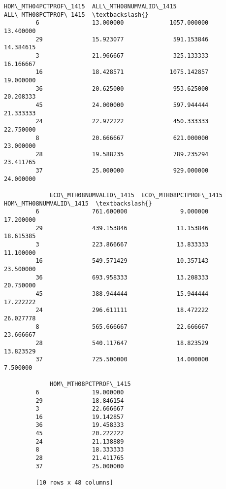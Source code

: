 \documentclass[11pt]{article}
\begin{document}
\begin{Verbatim}[commandchars=\\\{\}]
             HOM\_MTH04PCTPROF\_1415  ALL\_MTH08NUMVALID\_1415  ALL\_MTH08PCTPROF\_1415  \textbackslash{}
         6               13.000000             1057.000000              13.400000   
         29              15.923077              591.153846              14.384615   
         3               21.966667              325.133333              16.166667   
         16              18.428571             1075.142857              19.000000   
         36              20.625000              953.625000              20.208333   
         45              24.000000              597.944444              21.333333   
         24              22.972222              450.333333              22.750000   
         8               20.666667              621.000000              23.000000   
         28              19.588235              789.235294              23.411765   
         37              25.000000              929.000000              24.000000   
         
             ECD\_MTH08NUMVALID\_1415  ECD\_MTH08PCTPROF\_1415  HOM\_MTH08NUMVALID\_1415  \textbackslash{}
         6               761.600000               9.000000               17.200000   
         29              439.153846              11.153846               18.615385   
         3               223.866667              13.833333               11.100000   
         16              549.571429              10.357143               23.500000   
         36              693.958333              13.208333               20.750000   
         45              388.944444              15.944444               17.222222   
         24              296.611111              18.472222               26.027778   
         8               565.666667              22.666667               23.666667   
         28              540.117647              18.823529               13.823529   
         37              725.500000              14.000000                7.500000   
         
             HOM\_MTH08PCTPROF\_1415  
         6               19.000000  
         29              18.846154  
         3               22.666667  
         16              19.142857  
         36              19.458333  
         45              20.222222  
         24              21.138889  
         8               18.333333  
         28              21.411765  
         37              25.000000  
         
         [10 rows x 48 columns]
\end{Verbatim}
            
\end{document}
